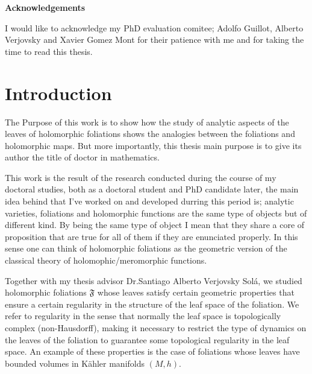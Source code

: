 \documentclass[12pt,twoside,a4paper]{report}
\begin{document}
\clearpage
\thispagestyle{plain}
\begin{center} 
    \huge\textbf{Acknowledgements}\\
\end{center}
    \normalsize
    I would like to acknowledge my PhD evaluation comitee; Adolfo Guillot, Alberto Verjovsky and Xavier Gomez Mont for their patience with me and for taking the time to read this thesis.
\clearpage


\tableofcontents %
\listoftables   %


\chapter{Introduction}
\pagestyle{fancy}
\fancyhf{}
\fancyhead[LE]{\rightmark}
\fancyhead[RO]{\leftmark}
\fancyfoot[C]{\thepage}
\noindent The Purpose of this work is to show how the study of analytic aspects of the leaves of holomorphic foliations shows the analogies between the foliations and holomorphic maps. But more importantly, this thesis main purpose is to give its author the title of doctor in mathematics.

This work is the result of the research conducted during the course of my doctoral studies, both as a doctoral student and PhD candidate later, the main idea behind that I've worked on and developed durring this period is; analytic varieties, foliations and holomorphic functions are the same type of objects but of different kind. By being the same type of object I mean that they share a core of proposition that are true for all of them if they are enunciated properly. In this sense one can think of holomorphic foliations as the geometric version of the classical theory of holomophic/meromorphic functions. 

Together with my thesis advisor Dr.Santiago Alberto Verjovsky Solá, we studied holomorphic foliations $\mathfrak{F}$ whose leaves satisfy certain geometric properties that ensure a certain regularity in the structure of the leaf space of the foliation. We refer to regularity in the sense that normally the leaf space is topologically complex (non-Hausdorff), making it necessary to restrict the type of dynamics on the leaves of the foliation to guarantee some topological regularity in the leaf space. An example of these properties is the case of foliations whose leaves have bounded volumes in K\"ahler manifolds $(M,h)$.
\end{document}

